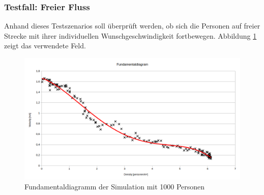 \subsubsection{Testfall: Freier Fluss}
Anhand dieses Testszenarios soll überprüft werden, ob sich die Personen auf freier Strecke mit ihrer individuellen Wunschgeschwindigkeit fortbewegen. Abbildung \ref{fig:freeflowVGLmap} zeigt das verwendete Feld. 


\begin{figure}[ht]
	\centering
	\includegraphics[width=\textwidth]{abbildungen/engstelle/1000P/fundamentalDiagram1000persons.png}
	\caption{Fundamentaldiagramm der Simulation mit 1000 Personen}
	\label{fig:freeflowVGLmap}
\end{figure}